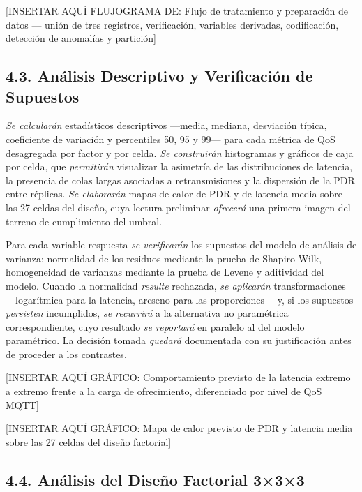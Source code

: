 \documentclass[
  12pt,
]{article}
\begin{document}
{[}INSERTAR AQUÍ FLUJOGRAMA DE: Flujo de tratamiento y preparación de
datos — unión de tres registros, verificación, variables derivadas,
codificación, detección de anomalías y partición{]}

\subsection{4.3. Análisis Descriptivo y Verificación de
Supuestos}\label{anuxe1lisis-descriptivo-y-verificaciuxf3n-de-supuestos}

\emph{Se calcularán} estadísticos descriptivos —media, mediana,
desviación típica, coeficiente de variación y percentiles 50, 95 y 99—
para cada métrica de QoS desagregada por factor y por celda. \emph{Se
construirán} histogramas y gráficos de caja por celda, que
\emph{permitirán} visualizar la asimetría de las distribuciones de
latencia, la presencia de colas largas asociadas a retransmisiones y la
dispersión de la PDR entre réplicas. \emph{Se elaborarán} mapas de calor
de PDR y de latencia media sobre las 27 celdas del diseño, cuya lectura
preliminar \emph{ofrecerá} una primera imagen del terreno de
cumplimiento del umbral.

Para cada variable respuesta \emph{se verificarán} los supuestos del
modelo de análisis de varianza: normalidad de los residuos mediante la
prueba de Shapiro-Wilk, homogeneidad de varianzas mediante la prueba de
Levene y aditividad del modelo. Cuando la normalidad \emph{resulte}
rechazada, \emph{se aplicarán} transformaciones —logarítmica para la
latencia, arcseno para las proporciones— y, si los supuestos
\emph{persisten} incumplidos, \emph{se recurrirá} a la alternativa no
paramétrica correspondiente, cuyo resultado \emph{se reportará} en
paralelo al del modelo paramétrico. La decisión tomada \emph{quedará}
documentada con su justificación antes de proceder a los contrastes.

{[}INSERTAR AQUÍ GRÁFICO: Comportamiento previsto de la latencia extremo
a extremo frente a la carga de ofrecimiento, diferenciado por nivel de
QoS MQTT{]}

{[}INSERTAR AQUÍ GRÁFICO: Mapa de calor previsto de PDR y latencia media
sobre las 27 celdas del diseño factorial{]}

\subsection{4.4. Análisis del Diseño Factorial
3×3×3}\label{anuxe1lisis-del-diseuxf1o-factorial-333}
\end{document}
